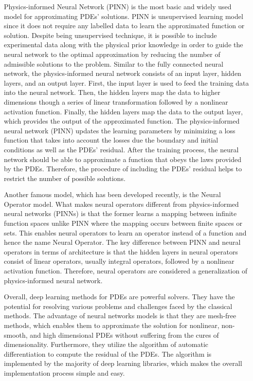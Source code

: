 \documentclass[a4paper, onecolumn, 12pt]{article}
\begin{document}
Physics-informed Neural Network (PINN) is the most basic and widely used model for approximating PDEs' solutions. 
PINN is unsupervised learning model since it does not require any 
labelled data to learn the approximated function or solution\cite{cuomo2022scientific}.
Despite being unsupervised technique, it is possible to include experimental data along with the physical prior knowledge
in order to guide the neural network to the optimal approximation by reducing the 
number of admissible solutions to the problem\cite{hao2022physics,raissi2019physics}.
Similar to the fully connected neural network, the physics-informed neural network consists of 
an input layer, hidden layers, and an output layer. First, the input layer is used to feed 
the training data into the neural network.  Then, the hidden layers map the data to higher dimensions though 
a series of linear transformation followed by a nonlinear activation function. 
Finally, the hidden layers map the data to the output layer, which provides the output of the approximated function. 
The physics-informed neural network (PINN) updates the learning parameters by minimizing a loss function that takes 
into account the losses due the boundary and initial conditions as well as the PDEs' residual. 
After the training process, the neural network should be able to approximate a function that obeys the laws provided by the PDEs. 
Therefore, the procedure of including the PDEs' residual helps to restrict the number of possible solutions\cite{cuomo2022scientific}. 

Another famous model, which has been developed recently, is the Neural Operator model. 
What makes neural operators different from physics-informed neural networks (PINNs) is that the former 
learns a mapping between infinite function spaces unlike PINN where the mapping occurs between finite spaces or sets. 
This enables neural operators to learn an operator instead of a function and hence the name Neural Operator.
The key difference between PINN and neural operators in terms of architecture is that the 
hidden layers in neural operators consist of linear operators, usually integral operators, 
followed by a nonlinear activation function. 
Therefore, neural operators are considered a generalization of physics-informed neural network\cite{kovachki2021neural}.

Overall, deep learning methods for PDEs are powerful solvers. 
They have the potential for resolving various problems and challenges faced by the classical methods. 
The advantage of neural networks models is that they are mesh-free methods, which enables them to approximate 
the solution for nonlinear, non-smooth, and high dimensional PDEs without suffering from the cures of dimensionality.
Furthermore, they utilize the algorithm of automatic differentiation to compute the residual of the PDEs. 
The algorithm is implemented by the majority of deep learning libraries, 
which makes the overall implementation process simple and easy. 
\end{document}
